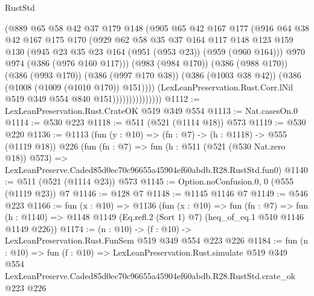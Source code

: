 \begin{lexlean}{RustStd}
\begin{coremodule}
                              (@889
                                @65
                                @58
                                @42
                                @37
                                @179
                                @148
                                (@905
                                  @65
                                  @42
                                  @167
                                  @177
                                  (@916
                                    @64
                                    @38
                                    @42
                                    @167
                                    @175
                                    @170
                                    (@929
                                      @62
                                      @58
                                      @35
                                      @37
                                      @164
                                      @117
                                      @148
                                      @123
                                      @159
                                      @130
                                      (@945 @23 @35 @23 @164 (@951 (@953 @23)) (@959 (@960 @164)))
                                      @970
                                      @974
                                      (@386 (@976 @160 @117)))
                                    (@983 (@984 @170))
                                    (@386 (@988 @170))
                                    (@386 (@993 @170))
                                    (@386 (@997 @170 @38))
                                    (@386 (@1003 @38 @42))
                                    (@386 (@1008 (@1009 (@1010 @170)) @151))))
                                (LexLeanPreservation.Rust.Corr.lNil
                                  @519
                                  @349
                                  @554
                                  @840
                                  @151)))))))))))))))
@1112 := LexLeanPreservation.Rust.CrateOK @519 @349 @554
@1113 := Nat.casesOn.{0}
@1114 := @530 @223
@1118 := @511 (@521 (@1114 @18)) @573
@1119 := @530 @220
@1136 := @1113
    (fun (y : @10) => (fn : @7) -> (h : @1118) -> @555 (@1119 @18))
    @226
    (fun (fn : @7) =>
    fun (h : @511 (@521 (@530 Nat.zero @18)) @573) =>
    LexLeanPreserve.Caded85d0ec70c96655a45904ef60abdb.R28.RustStd.fun0)
@1140 := @511 (@521 (@1114 @23)) @573
@1145 := Option.noConfusion.{0, 0} (@555 (@1119 @23)) @7
@1146 := @128 @7
@1148 := @1145 @1146 @7
@1149 := @546 @223
@1166 := fun (x : @10) =>
  @1136
    (fun (x : @10) =>
    fun (fn : @7) =>
    fun (h : @1140) => @1148 @1149 (Eq.refl.{2} (Sort 1) @7) (heq_of_eq.{1} @510 @1146 @1149 @226))
@1174 := (n : @10) -> (f : @10) -> LexLeanPreservation.Rust.FunSem @519 @349 @554 @223 @226
@1184 := fun (n : @10) =>
  fun (f : @10) =>
  LexLeanPreservation.Rust.simulate
    @519
    @349
    @554
    LexLeanPreserve.Caded85d0ec70c96655a45904ef60abdb.R28.RustStd.crate_ok
    @223
    @226
\end{coremodule}
\end{lexlean}
